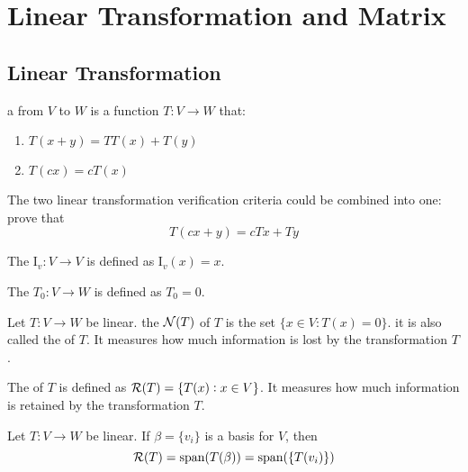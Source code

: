 \section{Linear Transformation and Matrix}

\subsection{Linear Transformation}


\begin{definition}
	a   from $V$ to $W$ is a function $T: V \rightarrow W$ that:
	\begin{enumerate}
		\item $T(x+y) = TT(x) + T(y)$
		\item $T(c x) = c T(x)$
	\end{enumerate}
\end{definition}

The two linear transformation verification criteria could be combined into one: prove that 
\begin{equation}
    T(cx + y) = cTx+Ty
\end{equation}


The   $\mathrm{I}_v : V \rightarrow V$ is defined as $\mathrm{I}_v(x) = x$.

The   $T_0: V \rightarrow W$ is defined as $T_0 = 0$.

\begin{definition}
	Let $T:V \rightarrow W$ be linear. the   $\mathcal{N}(T)$ of $T$ is the set $\{x \in V : T(x) = 0 \}$. it is also called the  of $T$. It measures how much  information is lost by the transformation $T$.
\end{definition}

\begin{definition}
	The   of $T$ is defined as $\mathcal{R}(T) = \{ {T(x):x \in V} \}$. It measures how much information is retained by the transformation $T$.
\end{definition}

\begin{theorem}
	Let $T: V \rightarrow W$ be linear. If $\beta=\{v_i\}$ is a basis for $V$, then
	\begin{equation}
		\mathcal{R}(T) = \text{span}(T(\beta)) = \text{span}( \{ T(v_i) \} )
	\end{equation}
\end{theorem}

